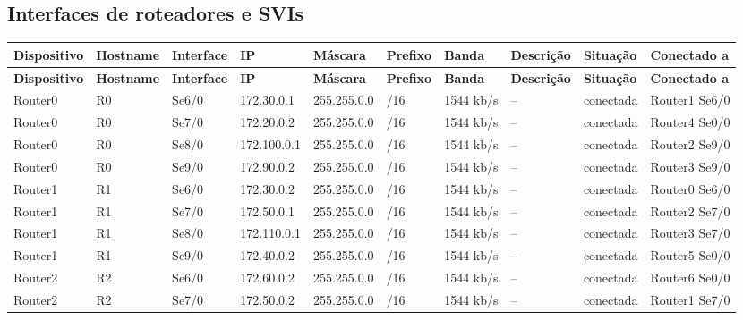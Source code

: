 \subsection{Interfaces de roteadores e SVIs}
\begingroup\scriptsize\setlength{\tabcolsep}{3pt}
\begin{longtable}{@{}p{}p{}p{}p{}p{}p{}p{}p{}p{}p{}@{}}
\toprule \textbf{Dispositivo} & \textbf{Hostname} & \textbf{Interface} & \textbf{IP} & \textbf{Máscara} & \textbf{Prefixo} & \textbf{Banda} & \textbf{Descrição} & \textbf{Situação} & \textbf{Conectado a} \\\midrule\endfirsthead
\toprule \textbf{Dispositivo} & \textbf{Hostname} & \textbf{Interface} & \textbf{IP} & \textbf{Máscara} & \textbf{Prefixo} & \textbf{Banda} & \textbf{Descrição} & \textbf{Situação} & \textbf{Conectado a} \\\midrule\endhead
Router0 & R0 & Se6/0 & 172.30.0.1 & 255.255.0.0 & /16 & 1544 kb/s & -- & conectada & Router1 Se6/0 \\
Router0 & R0 & Se7/0 & 172.20.0.2 & 255.255.0.0 & /16 & 1544 kb/s & -- & conectada & Router4 Se0/0 \\
Router0 & R0 & Se8/0 & 172.100.0.1 & 255.255.0.0 & /16 & 1544 kb/s & -- & conectada & Router2 Se9/0 \\
Router0 & R0 & Se9/0 & 172.90.0.2 & 255.255.0.0 & /16 & 1544 kb/s & -- & conectada & Router3 Se9/0 \\
Router1 & R1 & Se6/0 & 172.30.0.2 & 255.255.0.0 & /16 & 1544 kb/s & -- & conectada & Router0 Se6/0 \\
Router1 & R1 & Se7/0 & 172.50.0.1 & 255.255.0.0 & /16 & 1544 kb/s & -- & conectada & Router2 Se7/0 \\
Router1 & R1 & Se8/0 & 172.110.0.1 & 255.255.0.0 & /16 & 1544 kb/s & -- & conectada & Router3 Se7/0 \\
Router1 & R1 & Se9/0 & 172.40.0.2 & 255.255.0.0 & /16 & 1544 kb/s & -- & conectada & Router5 Se0/0 \\
Router2 & R2 & Se6/0 & 172.60.0.2 & 255.255.0.0 & /16 & 1544 kb/s & -- & conectada & Router6 Se0/0 \\
Router2 & R2 & Se7/0 & 172.50.0.2 & 255.255.0.0 & /16 & 1544 kb/s & -- & conectada & Router1 Se7/0 \\

\end{longtable}
